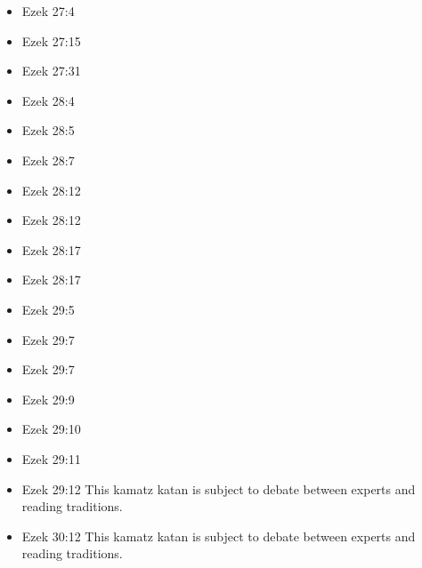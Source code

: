 \documentclass[14pt]{article}
\begin{document}
\begin{multicols}{2}
\begin{itemize}
												\item Ezek 27:4
												
												\item Ezek 27:15
												
												\item Ezek 27:31
												
												\item Ezek 28:4
												
												\item Ezek 28:5
												
												\item Ezek 28:7
												
												\item Ezek 28:12
												
												\item Ezek 28:12
												
												\item Ezek 28:17
												
												\item Ezek 28:17
												
												\item Ezek 29:5
												
												\item Ezek 29:7
														
														\item Ezek 29:7
														
														\item Ezek 29:9
														
														\item Ezek 29:10
														
														\item Ezek 29:11
														
														\item Ezek 29:12 This kamatz katan is subject to debate between experts and reading traditions.
														
														\item Ezek 30:12 This kamatz katan is subject to debate between experts and reading traditions.
														

\end{itemize}
\end{multicols}
\end{document}

